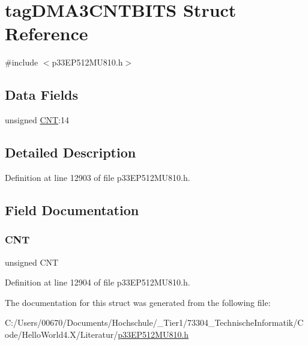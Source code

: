 \hypertarget{structtag_d_m_a3_c_n_t_b_i_t_s}{}\section{tag\+D\+M\+A3\+C\+N\+T\+B\+I\+TS Struct Reference}
\label{structtag_d_m_a3_c_n_t_b_i_t_s}


{\ttfamily \#include $<$p33\+E\+P512\+M\+U810.\+h$>$}

\subsection*{Data Fields}
\begin{DoxyCompactItemize}
\item 
unsigned \hyperlink{structtag_d_m_a3_c_n_t_b_i_t_s_a30be39d82c244f19fd98dd74227487f6}{C\+NT}\+:14
\end{DoxyCompactItemize}


\subsection{Detailed Description}


Definition at line 12903 of file p33\+E\+P512\+M\+U810.\+h.



\subsection{Field Documentation}
\mbox{\label{structtag_d_m_a3_c_n_t_b_i_t_s_a30be39d82c244f19fd98dd74227487f6}} 
\subsubsection{\texorpdfstring{C\+NT}{CNT}}
{\footnotesize\ttfamily unsigned C\+NT}



Definition at line 12904 of file p33\+E\+P512\+M\+U810.\+h.



The documentation for this struct was generated from the following file\+:\begin{DoxyCompactItemize}
\item 
C\+:/\+Users/00670/\+Documents/\+Hochschule/\+\_\+\+Tier1/73304\+\_\+\+Technische\+Informatik/\+Code/\+Hello\+World4.\+X/\+Literatur/\hyperlink{p33_e_p512_m_u810_8h}{p33\+E\+P512\+M\+U810.\+h}\end{DoxyCompactItemize}

